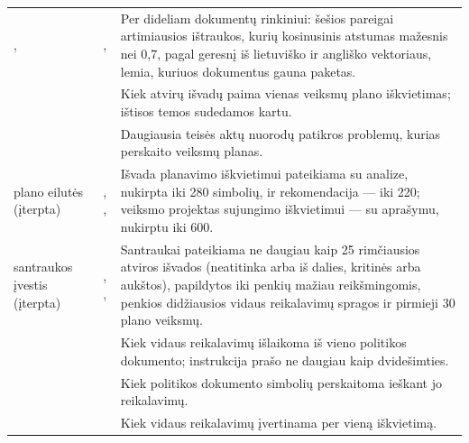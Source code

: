 \begin{xltabular}{\textwidth}{@{}L{44mm}L{19mm}Y@{}}
,  & ,  & Per dideliam dokumentų rinkiniui: šešios pareigai artimiausios ištraukos, kurių kosinusinis atstumas mažesnis nei 0,7, pagal geresnį iš lietuviško ir angliško vektoriaus, lemia, kuriuos dokumentus gauna paketas. \\
 &  & Kiek atvirų išvadų paima vienas veiksmų plano iškvietimas; ištisos temos sudedamos kartu. \\
 &  & Daugiausia teisės aktų nuorodų patikros problemų, kurias perskaito veiksmų planas. \\
plano eilutės (įterpta) & , ,  & Išvada planavimo iškvietimui pateikiama su analize, nukirpta iki 280 simbolių, ir rekomendacija --- iki 220; veiksmo projektas sujungimo iškvietimui --- su aprašymu, nukirptu iki 600. \\
santraukos įvestis (įterpta) & , ,  & Santraukai pateikiama ne daugiau kaip 25 rimčiausios atviros išvados (neatitinka arba iš dalies, kritinės arba aukštos), papildytos iki penkių mažiau reikšmingomis, penkios didžiausios vidaus reikalavimų spragos ir pirmieji 30 plano veiksmų. \\
 &  & Kiek vidaus reikalavimų išlaikoma iš vieno politikos dokumento; instrukcija prašo ne daugiau kaip dvidešimties. \\
 &  & Kiek politikos dokumento simbolių perskaitoma ieškant jo reikalavimų. \\
 &  & Kiek vidaus reikalavimų įvertinama per vieną iškvietimą. \\

\end{xltabular}

